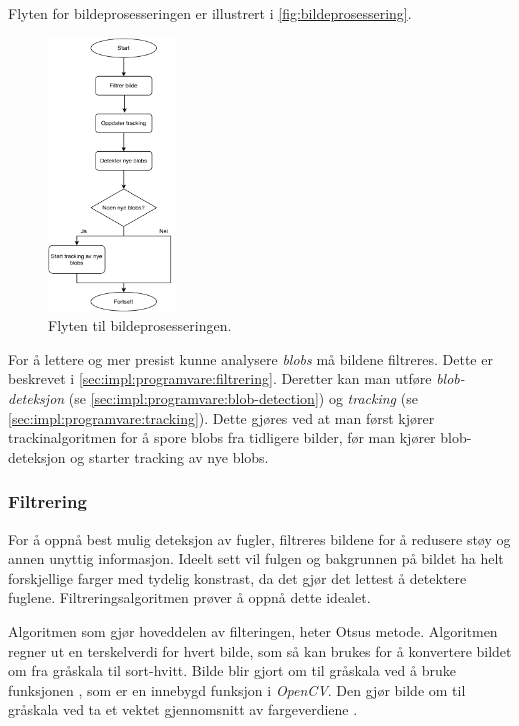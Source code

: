 Flyten for bildeprosesseringen er illustrert i \autoref{fig:bildeprosessering}.

\begin{figure}[H]
    \centering
    \includegraphics[width=0.3\textwidth]{implementering/Program/bildepros.pdf}
    \caption{Flyten til bildeprosesseringen.}
    \label{fig:bildeprosessering}
\end{figure}

For å lettere og mer presist kunne analysere \textit{blobs} må bildene filtreres. 
Dette er beskrevet i \autoref{sec:impl:programvare:filtrering}. 
Deretter kan man utføre \textit{blob-deteksjon} (se \autoref{sec:impl:programvare:blob-detection}) og \textit{tracking} (se \autoref{sec:impl:programvare:tracking}). 
Dette gjøres ved at man først kjører trackinalgoritmen for å spore blobs fra tidligere bilder, før man kjører blob-deteksjon og starter tracking av nye blobs. 

\subsubsection{Filtrering}\label{sec:impl:programvare:filtrering}
For å oppnå best mulig deteksjon av fugler, filtreres bildene for å redusere støy og annen unyttig informasjon. 
Ideelt sett vil fulgen og bakgrunnen på bildet ha helt forskjellige farger med tydelig konstrast, da det gjør det lettest å detektere fuglene. 
Filtreringsalgoritmen prøver å oppnå dette idealet. 

Algoritmen som gjør hoveddelen av filteringen, heter Otsus metode\cite{otsu}. 
Algoritmen regner ut en terskelverdi for hvert bilde, som så kan brukes for å konvertere bildet om fra gråskala til sort-hvitt. 
Bilde blir gjort om til gråskala ved å bruke funksjonen , som er en innebygd funksjon i \textit{OpenCV}. Den gjør bilde om til gråskala ved ta et vektet gjennomsnitt av fargeverdiene \cite{cvtColor}.


